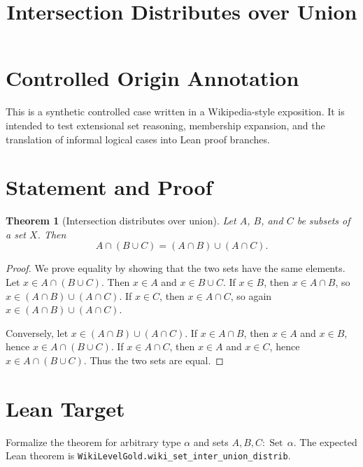 \documentclass[11pt]{article}
\title{Intersection Distributes over Union}
\author{}
\date{}
\newtheorem{theorem}{Theorem}
\begin{document}
\maketitle

\section*{Controlled Origin Annotation}
This is a synthetic controlled case written in a Wikipedia-style exposition.
It is intended to test extensional set reasoning, membership expansion, and
the translation of informal logical cases into Lean proof branches.

\section*{Statement and Proof}

\begin{theorem}[Intersection distributes over union]
Let $A$, $B$, and $C$ be subsets of a set $X$. Then
\[
  A \cap (B \cup C) = (A \cap B) \cup (A \cap C).
\]
\end{theorem}

\begin{proof}
We prove equality by showing that the two sets have the same elements.
Let $x \in A \cap (B \cup C)$. Then $x \in A$ and $x \in B \cup C$.
If $x \in B$, then $x \in A \cap B$, so
$x \in (A \cap B) \cup (A \cap C)$. If $x \in C$, then
$x \in A \cap C$, so again $x \in (A \cap B) \cup (A \cap C)$.

Conversely, let $x \in (A \cap B) \cup (A \cap C)$. If
$x \in A \cap B$, then $x \in A$ and $x \in B$, hence
$x \in A \cap (B \cup C)$. If $x \in A \cap C$, then $x \in A$ and
$x \in C$, hence $x \in A \cap (B \cup C)$. Thus the two sets are equal.
\end{proof}

\section*{Lean Target}
Formalize the theorem for arbitrary type $\alpha$ and sets
$A,B,C : \operatorname{Set}\,\alpha$. The expected Lean theorem is
\texttt{WikiLevelGold.wiki\_set\_inter\_union\_distrib}.
\end{document}
